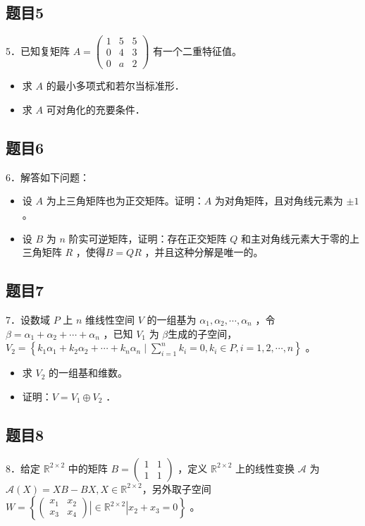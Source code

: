 \documentclass{article}
\begin{document}
\subsection{题目5}
5．已知复矩阵 \(A=\left(\begin{array}{ccc}1 & 5 & 5 \\ 0 & 4 & 3 \\ 0 & a & 2\end{array}\right)\) 有一个二重特征值。

\begin{itemize}
  \item[（1）] 求 \(A\) 的最小多项式和若尔当标准形．
  \item[（2）] 求 \(A\) 可对角化的充要条件．
\end{itemize}

\subsection{题目6}
6．解答如下问题：

\begin{itemize}
  \item[（1）] 设 \(A\) 为上三角矩阵也为正交矩阵。证明：\(A\) 为对角矩阵，且对角线元素为 \(\pm 1\) 。
  \item[（2）] 设 \(B\) 为 \(n\) 阶实可逆矩阵，证明：存在正交矩阵 \(Q\) 和主对角线元素大于零的上三角矩阵 \(R\) ，使得\(B=Q R\) ，并且这种分解是唯一的。
\end{itemize}

\subsection{题目7}
7．设数域 \(P\) 上 \(n\) 维线性空间 \(V\) 的一组基为 \(\alpha_{1}, \alpha_{2}, \cdots, \alpha_{n}\) ，令 \(\beta=\alpha_{1}+\alpha_{2}+\cdots+\alpha_{n}\) ，已知 \(V_{1}\) 为 \(\beta\)生成的子空间，\(V_{2}=\left\{k_{1} \alpha_{1}+k_{2} \alpha_{2}+\cdots+k_{n} \alpha_{n} \mid \sum_{i=1}^{n} k_{i}=0, k_{i} \in P, i=1,2, \cdots, n\right\}\) 。

\begin{itemize}
  \item[（1）] 求 \(V_{2}\) 的一组基和维数。
  \item[（2）] 证明：\(V=V_{1} \oplus V_{2}\) ．
\end{itemize}

\subsection{题目8}
8．给定 \(\mathbb{R}^{2 \times 2}\) 中的矩阵 \(B=\left(\begin{array}{ll}1 & 1 \\ 1 & 1\end{array}\right)\) ，定义 \(\mathbb{R}^{2 \times 2}\) 上的线性变换 \(\mathcal{A}\) 为 \(\mathcal{A}(X)=X B-B X, X \in \mathbb{R}^{2 \times 2}\)，另外取子空间 \(W=\left\{\left(\begin{array}{ll}x_{1} & x_{2} \\ x_{3} & x_{4}\end{array}\right)\left|\in \mathbb{R}^{2 \times 2}\right| x_{2}+x_{3}=0\right\}\) 。
\end{document}
